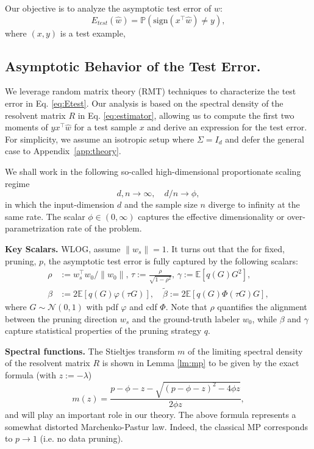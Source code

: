Our objective is to analyze the asymptotic test error of $\hat{w}$:
\begin{equation}
    E_{test}(\hat{w}) = \mathbb{P}(\text{sign}(x^\top \hat{w}) \ne y),
    \label{eq:Etest}
\end{equation}
where $(x, y)$ is a test example,

\subsection{Asymptotic Behavior of the Test Error.}
We leverage random matrix theory (RMT) techniques \citep{Couillet_Liao_2022, ZhenyuAndMahoney2021, Firdoussi2024} to characterize the test error in Eq. \eqref{eq:Etest}. Our analysis is based on the spectral density of the resolvent matrix $R$ in Eq. \eqref{eq:estimator}, allowing us to compute the first two moments of $yx^\top \hat{w}$ for a test sample $x$ and derive an expression for the test error. For simplicity, we assume an isotropic setup where $\Sigma = I_d$ and defer the general case to Appendix~\ref{app:theory}.

We shall work in the following so-called high-dimensional proportionate scaling regime
\begin{equation}
\label{eq:proportionate}
    d,n \to \infty,\quad d/n \to \phi,
\end{equation}
in which the input-dimension $d$ and the sample size $n$ diverge to infinity at the same rate.
The scalar $\phi \in (0,\infty)$ captures the effective dimensionality or over-parametrization rate of the problem.

\textbf{Key Scalars.}
WLOG, assume $\|w_s\|=1$. It turns out that the for fixed, pruning, $p$, the asymptotic test error is fully captured by the following scalars:
{
\begin{equation}
    \begin{split}
    \rho &:= w_s^\top w_0/\|w_0\|, \, \tau := \frac{\rho}{\sqrt{1-\rho^2}},\, \gamma := \mathbb{E}[q(G)G^2],\\
    \beta &:= 2\mathbb{E}[q(G)\varphi(\tau G)],\quad  \tilde \beta := 2\mathbb{E}[q(G)\Phi(\tau G)G],
\end{split}
\end{equation}
}
where $G \sim \mathcal N(0,1)$ with pdf $\varphi$ and cdf $\Phi$. Note that $\rho$ quantifies the alignment between the pruning direction $w_s$ and the ground-truth labeler $w_0$, while $\beta$ and $\gamma$ capture statistical properties of the pruning strategy $q$.

\textbf{Spectral functions.} The Stieltjes transform $m$ of the limiting spectral density of the resolvent matrix $R$ is shown in Lemma \ref{lm:mp} to be given by the exact formula (with $z:=-\lambda$)
\begin{equation}    
 m(z) = \frac{p-\phi-z - \sqrt{(p-\phi-z)^2-4\phi z}}{2\phi z},
\label{eq:meq-mp}
\end{equation}
and will play an important role in our theory.
 The above formula represents a somewhat distorted Marchenko-Pastur law. 
 Indeed, the classical MP \citep{MP1967} corresponds to $p \to 1$ (i.e. no data pruning).
 
